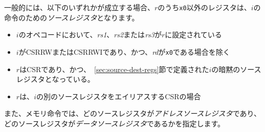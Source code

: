 \begin{comment}
In general, a register $r$ other than {\tt x0} is a {\em source register} for an instruction $i$ if any of the following hold:
\begin{itemize}
  \item In the opcode of $i$, {\em rs1}, {\em rs2}, or {\em rs3} is set to $r$
  \item $i$ is a CSR instruction, and in the opcode of $i$, {\em csr} is set to $r$, unless $i$ is CSRRW or CSRRWI and {\em rd} is set to {\tt x0}
  \item $r$ is a CSR and an implicit source register for $i$, as defined in Section~\ref{sec:source-dest-regs}
  \item $r$ is a CSR that aliases with another source register for $i$
\end{itemize}
Memory instructions also further specify which source registers are {\em address source registers} and which are {\em data source registers}.
\end{comment}

一般的には、以下のいずれかが成立する場合、$r$のうち{\tt x0}以外のレジスタは、$i$の命令のための{\em ソースレジスタ}となります。
\begin{itemize}
  \item $i$のオペコードにおいて、{\em rs1}、{\em rs2}または{\em rs3}が$r$に設定されている
  \item $i$がCSRRWまたはCSRRWIであり、かつ、{\em rd}が{\tt x0}である場合を除く
  \item $r$はCSRであり、かつ、~\ref{sec:source-dest-regs}節で定義された$i$の暗黙のソースレジスタとなっている。
  \item $r$は、$i$の別のソースレジスタをエイリアスするCSRの場合
\end{itemize}
また、メモリ命令では、どのソースレジスタが{\em アドレスソースレジスタ}であり、どのソースレジスタが{\em データソースレジスタ}であるかを指定します。


\begin{comment}
In general, a register $r$ other than {\tt x0} is a {\em destination register} for an instruction $i$ if any of the following hold:
\begin{itemize}
  \item In the opcode of $i$, {\em rd} is set to $r$
  \item $i$ is a CSR instruction, and in the opcode of $i$, {\em csr} is set to $r$, unless $i$ is CSRRS or CSRRC and {\em rs1} is set to {\tt x0} or $i$ is CSRRSI or CSRRCI and uimm[4:0] is set to zero.
  \item $r$ is a CSR and an implicit destination register for $i$, as defined in Section~\ref{sec:source-dest-regs}
  \item $r$ is a CSR that aliases with another destination register for $i$
\end{itemize}
\end{comment}


